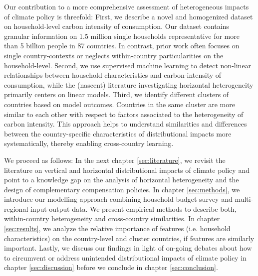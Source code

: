 \documentclass[12pt, a4paper]{article}
\begin{document}
Our contribution to a more comprehensive assessment of heterogeneous impacts of climate policy is threefold: First, we describe a novel and homogenized dataset on household-level carbon intensity of consumption. Our dataset contains granular information on 1.5 million single households representative for more than 5 billion people in 87 countries. In contrast, prior work often focuses on single country-contexts or neglects within-country particularities on the household-level. Second, we use supervised machine learning to detect non-linear relationships between household characteristics and carbon-intensity of consumption, while the (nascent) literature investigating horizontal heterogeneity primarily centers on linear models. Third, we identify different clusters of countries based on model outcomes. Countries in the same cluster are more similar to each other with respect to factors associated to the heterogeneity of carbon intensity. This approach helps to understand similarities and differences between the country-specific characteristics of distributional impacts more systematically, thereby enabling cross-country learning. 


We proceed as follows: In the next chapter \ref{sec:literature}, we revisit the literature on vertical and horizontal distributional impacts of climate policy and point to a knowledge gap on the analysis of horizontal heterogeneity and the design of complementary compensation policies. In chapter \ref{sec:methods}, we introduce our modelling approach combining household budget survey and multi-regional input-output data. We present empirical methods to describe both, within-country heterogeneity and cross-country similarities. In chapter \ref{sec:results}, we analyze the relative importance of features (i.e. household characteristics) on the country-level and cluster countries, if features are similarly important. Lastly, we discuss our findings in light of on-going debates about how to circumvent or address unintended distributional impacts of climate policy in chapter \ref{sec:discussion} before we conclude in chapter \ref{sec:conclusion}.  
\end{document}
